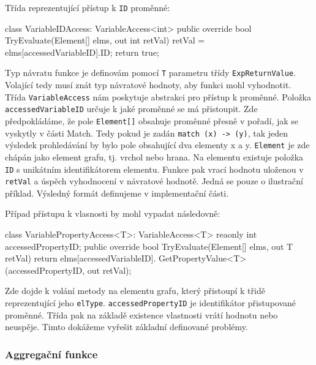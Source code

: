 Třída reprezentující přístup k \verb+ID+ proměnné:
\begin{code}
class VariableIDAccess: VariableAccess<int> {
  public override bool TryEvaluate(Element[] elms, out int retVal) {
     retVal = elms[accessedVariableID].ID;
     return true; } }
\end{code}
Typ návratu funkce je definovám pomocí \texttt{T} parametru třídy \texttt{ExpReturnValue}.
Volající tedy musí znát typ návratové hodnoty, aby funkci mohl vyhodnotit.
Třída \verb+VariableAccess+ nám poskytuje abstrakci pro přístup k proměnné.
Položka \verb+accessedVariableID+ určuje k jaké proměnné se má přistoupit.
Zde předpokládáme, že pole \verb+Element[]+ obsahuje proměnné přesně v pořadí, jak se vyskytly v části Match.
Tedy pokud je zadán \texttt{match (x) -> (y)}, tak jeden výsledek prohledávání by bylo pole obsahující dva elementy x a y.
\texttt{Element} je zde chápán jako element grafu, tj. vrchol nebo hrana.
Na elementu existuje položka \texttt{ID} s unikátním identifikátorem elementu.
Funkce pak vrací hodnotu uloženou v \texttt{retVal} a úspěch vyhodnocení v návratové hodnotě. 
Jedná se pouze o ilustrační příklad. 
Výsledný formát definujeme v implementační části.

Případ přístupu k vlasnosti by mohl vypadat následovně:
\begin{code}
class VariablePropertyAccess<T>: VariableAccess<T> {
  reaonly int accessedPropertyID; 
  public override bool TryEvaluate(Element[] elms, out T retVal) {
    return elms[accessedVariableID].
               GetPropertyValue<T>(accessedPropertyID, out retVal);
  }
}
\end{code}
Zde dojde k volání metody na elementu grafu, který přistoupí k třidě reprezentující jeho \verb+elType+.
\texttt{accessedPropertyID} je identifikátor přistupované proměnné.
Třída pak na základě existence vlastnosti vrátí hodnotu nebo neuspěje.
Timto dokážeme vyřešit základní definované problémy.

\subsubsection{Aggregační funkce}

